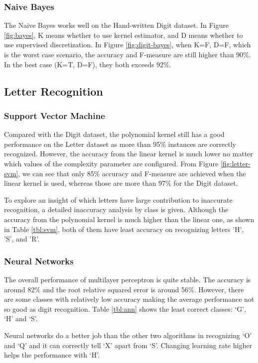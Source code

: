 \documentclass[11pt]{article}
\begin{document}
\subsubsection{Naive Bayes}
The Naive Bayes works well on the Hand-written Digit dataset. In Figure \ref{fig:bayes}, K means whether to use kernel estimator, and D means whether to use supervised discretization. In Figure \ref{fig:digit-bayes}, when K=F, D=F, which is the worst case scenario, the accuracy and F-measure are still higher than 90\%. In the best case (K=T, D=F), they both exceeds 92\%.


\subsection{Letter Recognition}
\subsubsection{Support Vector Machine}

Compared with the Digit dataset, the polynomial kernel still has a good performance on the Letter dataset as more than 95\% instances are correctly recognized. However, the accuracy from the linear kernel is much lower no matter which values of the complexity parameter are configured. From Figure \ref{fig:letter-svm}, we can see that only 85\% accuracy and F-measure are achieved when the linear kernel is used, whereas those are more than 97\% for the Digit dataset.

To explore an insight of which letters have large contribution to inaccurate recognition, a detailed inaccuracy analysis by class is given. Although the accuracy from the polynomial kernel is much higher than the linear one, as shown in Table \ref{tbl:svm}, both of them have least accuracy on recognizing letters 'H', 'S', and 'R'.


\subsubsection{Neural Networks}
The overall performance of multilayer perceptron is quite stable. The accuracy is around 82\% and the root relative squared error is around 56\%. However, there are some classes with relatively low accuracy making the average performance not so good as digit recognition. Table \ref{tbl:ann} shows the least correct classes: `G', `H' and `S'.

Neural networks do a better job than the other two algorithms in recognizing `O' and `Q' and it can correctly tell `X' apart from `S'. Changing learning rate higher helps the performance with `H'.
\end{document}
